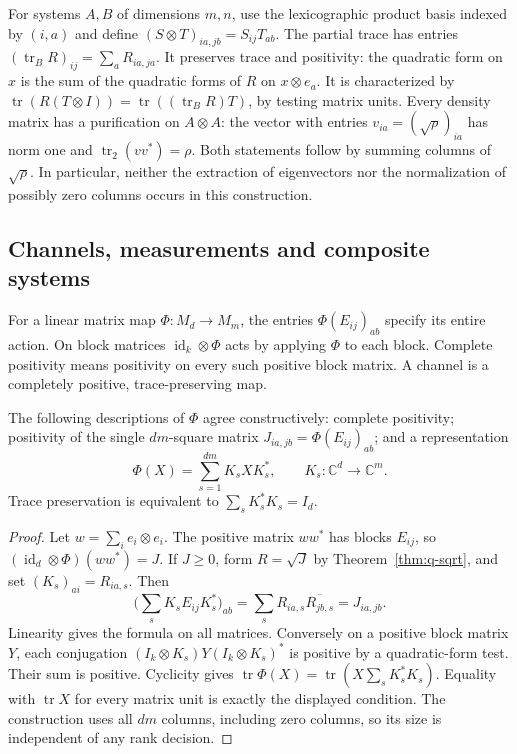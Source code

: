 For systems \(A,B\) of dimensions \(m,n\), use the lexicographic product
basis indexed by \((i,a)\) and define
\((S\otimes T)_{ia,jb}=S_{ij}T_{ab}\).
The partial trace has entries
\((\operatorname{tr}_B R)_{ij}=\sum_a R_{ia,ja}\).
It preserves trace and positivity: the quadratic form on \(x\) is the
sum of the quadratic forms of \(R\) on \(x\otimes e_a\).
It is characterized by
\(\operatorname{tr}(R(T\otimes I))=
\operatorname{tr}((\operatorname{tr}_B R)T)\), by testing matrix units.
Every density matrix has a purification on \(A\otimes A\):
the vector with entries \(v_{ia}=(\sqrt\rho)_{ia}\) has norm one and
\(\operatorname{tr}_2(vv^*)=\rho\).
Both statements follow by summing columns of \(\sqrt\rho\).
In particular, neither the extraction of eigenvectors nor the
normalization of possibly zero columns occurs in this construction.

\subsection{Channels, measurements and composite systems}

For a linear matrix map \(\Phi:M_d\to M_m\), the entries
\(\Phi(E_{ij})_{ab}\) specify its entire action. On block matrices
\(\operatorname{id}_k\otimes\Phi\) acts by applying \(\Phi\) to each
block. Complete positivity means positivity on every such positive
block matrix. A channel is a completely positive, trace-preserving map.

\begin{theorem}\label{thm:q-choi}
The following descriptions of \(\Phi\) agree constructively:
complete positivity; positivity of the single \(dm\)-square matrix
\(J_{ia,jb}=\Phi(E_{ij})_{ab}\); and a representation
\[
 \Phi(X)=\sum_{s=1}^{dm}K_s X K_s^*,\qquad K_s:\mathbb C^d\to\mathbb C^m.
\]
Trace preservation is equivalent to \(\sum_s K_s^*K_s=I_d\).
\end{theorem}
\begin{proof}
Let \(w=\sum_i e_i\otimes e_i\). The positive matrix \(ww^*\)
has blocks \(E_{ij}\), so \((\operatorname{id}_d\otimes\Phi)(ww^*)=J\).
If \(J\ge0\), form \(R=\sqrt J\) by Theorem~\ref{thm:q-sqrt}, and set
\((K_s)_{ai}=R_{ia,s}\). Then
\[
 \bigg(\sum_s K_s E_{ij}K_s^*\bigg)_{ab}
 =\sum_s R_{ia,s}\overline{R_{jb,s}}=J_{ia,jb}.
\]
Linearity gives the formula on all matrices. Conversely on a positive
block matrix \(Y\), each conjugation
\((I_k\otimes K_s)Y(I_k\otimes K_s)^*\) is positive by a
quadratic-form test. Their sum is positive. Cyclicity gives
\(\operatorname{tr}\Phi(X)=\operatorname{tr}(X\sum_s K_s^*K_s)\).
Equality with \(\operatorname{tr}X\) for every matrix unit is exactly
the displayed condition. The construction uses all \(dm\) columns,
including zero columns, so its size is independent of any rank decision.
\end{proof}

